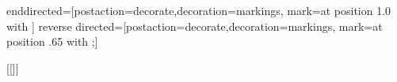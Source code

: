 \tikzstyle enddirected=[postaction={decorate,decoration={markings,
    mark=at position 1.0 with {}}}]
\tikzstyle reverse directed=[postaction={decorate,decoration={markings,
    mark=at position .65 with {;}}}]

\newcommand{\avg}[1] {
  \langle #1 \rangle
}

\newcommand{\prog}[1]{\texttt{#1}}
\DeclareMathOperator{\sign}{sign}

\newcommand{\gluon}{g}
\newcommand{\quark}{q}
\newcommand{\squark}{{\tilde q}}
\newcommand{\upsquark}{{\tilde u}}
\newcommand{\downsquark}{{\tilde d}}
\newcommand{\gluino}{{\tilde g}}
\newcommand{\gaugino}{{\tilde \chi}}
\newcommand{\ghost}{c}


\makeatletter
\DeclareCiteCommand{\arxivcite}[\mkbibbrackets]
  {}
  {%
   \newunit
   }
  {\multicitedelim}
  {}
  \makeatother
